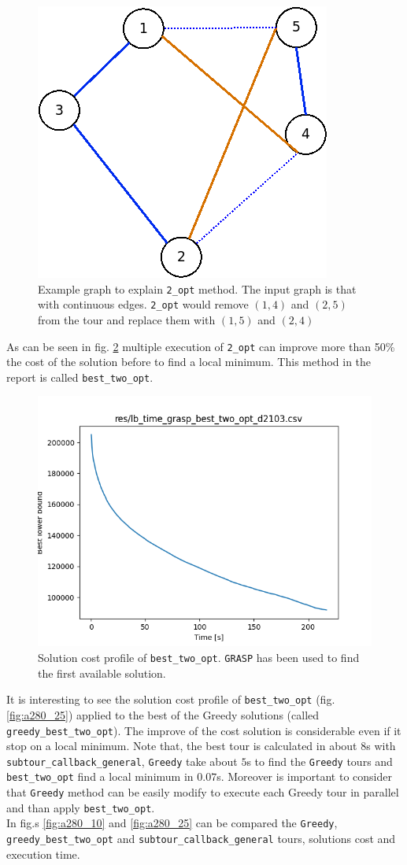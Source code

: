 \begin{figure}[h]
	\centering
	\includegraphics[width=.3\columnwidth]{img/2_opt_graph.png}
	\caption{Example graph to explain \texttt{2\_opt} method. The input graph is that with continuous edges. \texttt{2\_opt} would remove $ (1,4) $ and $ (2,5) $ from the tour and replace them with $ (1,5) $ and $  (2,4) $}
	\label{fig:2_opt_graph}
\end{figure}
As can be seen in fig. \ref{fig:lb_time_grasp_best_two_opt_d2103} multiple execution of \texttt{2\_opt} can improve more than 50\% the cost of the solution before to find a local minimum. This method in the report is called \texttt{best\_two\_opt}.
\begin{figure}[!h]
\centering
\includegraphics[width=.6\columnwidth]{../res/lb_time_grasp_best_two_opt_d2103.png}
\caption{Solution cost profile of \texttt{best\_two\_opt}. \texttt{GRASP} has been used to find the first available solution.}
\label{fig:lb_time_grasp_best_two_opt_d2103}
\end{figure}

It is interesting to see the solution cost profile of \texttt{best\_two\_opt} (fig. \ref{fig:a280_25}) applied to the best of the Greedy solutions (called \texttt{greedy\_best\_two\_opt}). The improve of the cost solution is considerable even if it stop on a local minimum.  Note that, the best tour is calculated in about $ 8 $s with \texttt{subtour\_callback\_general}, \texttt{Greedy} take about $ 5 $s to find the \texttt{Greedy} tours and \texttt{best\_two\_opt} find a local minimum in $0.07$s. Moreover is important to consider that \texttt{Greedy} method can be easily modify to execute each Greedy tour in parallel and than apply \texttt{best\_two\_opt}.\\
In fig.s \ref{fig:a280_10} and \ref{fig:a280_25} can be compared the \texttt{Greedy}, \texttt{greedy\_best\_two\_opt} and \texttt{subtour\_callback\_general} tours, solutions cost and execution time.\\


